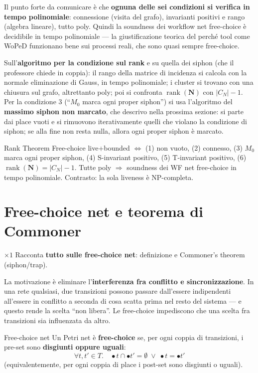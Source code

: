 Il punto forte da comunicare è che \textbf{ognuna delle sei condizioni si verifica in tempo polinomiale}: connessione (visita del grafo), invarianti positivi e rango (algebra lineare), tutto poly. Quindi la soundness dei workflow net free-choice è decidibile in tempo polinomiale — la giustificazione teorica del perché tool come WoPeD funzionano bene sui processi reali, che sono quasi sempre free-choice.

Sull'\textbf{algoritmo per la condizione sul rank} e su quella dei siphon (che il professore chiede in coppia): il rango della matrice di incidenza si calcola con la normale eliminazione di Gauss, in tempo polinomiale; i cluster si trovano con una chiusura sul grafo, altrettanto poly; poi si confronta $\operatorname{rank}(\mathbf{N})$ con $|C_N|-1$. Per la condizione 3 (``$M_0$ marca ogni proper siphon'') si usa l'algoritmo del \textbf{massimo siphon non marcato}, che descrivo nella prossima sezione: si parte dai place vuoti e si rimuovono iterativamente quelli che violano la condizione di siphon; se alla fine non resta nulla, allora ogni proper siphon è marcato.

\begin{puntochiave}{Rank Theorem}
Free-choice live+bounded $\iff$ (1) non vuoto, (2) connesso, (3) $M_0$ marca ogni proper siphon, (4) S-invariant positivo, (5) T-invariant positivo, (6) $\operatorname{rank}(\mathbf N)=|C_N|-1$. Tutte poly $\Rightarrow$ soundness dei WF net free-choice in tempo polinomiale. Contrasto: la sola liveness è NP-completa.
\end{puntochiave}

\section{Free-choice net e teorema di Commoner}

\begin{domanda}{$\times 1$}
Racconta \textbf{tutto sulle free-choice net}: definizione e Commoner's theorem (siphon/trap).
\end{domanda}

La motivazione è eliminare l'\textbf{interferenza fra conflitto e sincronizzazione}. In una rete qualsiasi, due transizioni possono passare dall'essere indipendenti all'essere in conflitto a seconda di cosa scatta prima nel resto del sistema — e questo rende la scelta ``non libera''. Le free-choice impediscono che una scelta fra transizioni sia influenzata da altro.

\begin{definizione}{Free-choice net}
Un Petri net è \textbf{free-choice} se, per ogni coppia di transizioni, i pre-set sono \textbf{disgiunti oppure uguali}:
$$\forall t,t' \in T.\quad \bullet t \cap \bullet t' = \emptyset \;\lor\; \bullet t = \bullet t'$$
(equivalentemente, per ogni coppia di place i post-set sono disgiunti o uguali).
\end{definizione}


